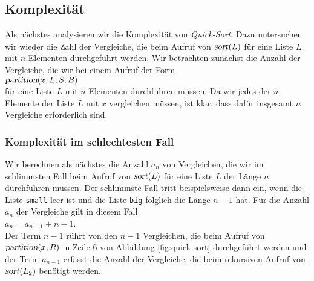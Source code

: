 \subsection{Komplexit\"at}
Als n\"achstes analysieren wir die Komplexit\"at von \emph{Quick-Sort}.
Dazu untersuchen wir wieder die Zahl der Vergleiche, die beim Aufruf von
$\textsl{sort}(L)$ f\"ur eine Liste $L$ mit $n$ 
Elementen durchgef\"uhrt werden. Wir betrachten zun\"achst die Anzahl der Vergleiche,
die wir bei einem Aufruf der Form
\\[0.2cm]
\hspace*{1.3cm}
$\textsl{partition}(x,L,S,B)$ \\[0.2cm]
f\"ur eine Liste $L$ mit $n$ Elementen durchf\"uhren m\"ussen. 
Da wir jedes der $n$ Elemente der Liste $L$ mit $x$ vergleichen m\"ussen, ist klar, dass 
daf\"ur insgesamt $n$ Vergleiche erforderlich sind.

\subsubsection{Komplexit\"at im schlechtesten Fall}
Wir berechnen als n\"achstes die Anzahl $a_n$ von Vergleichen, die wir im schlimmsten Fall
beim Aufruf von $\textsl{sort}(L)$ f\"ur eine Liste $L$ der L\"ange $n$ durchf\"uhren m\"ussen.
Der schlimmste Fall tritt beispielsweise dann ein, wenn die Liste \texttt{small} leer ist und 
die Liste \texttt{big} folglich  die L\"ange $n-1$ hat.   F\"ur die Anzahl
$a_n$ der Vergleiche gilt in diesem Fall \\[0.2cm]
\hspace*{1.3cm} $a_n = a_{n-1} + n - 1$. \\[0.2cm]
Der Term $n-1$ r\"uhrt von den $n-1$ Vergleichen, die beim Aufruf von
$\textsl{partition}(x,R)$ in Zeile 6 von Abbildung \ref{fig:quick-sort} durchgef\"uhrt
werden und der Term $a_{n-1}$ erfasst die Anzahl der Vergleiche, die beim rekursiven Aufruf
von $\textsl{sort}(L_2)$ ben\"otigt werden.

